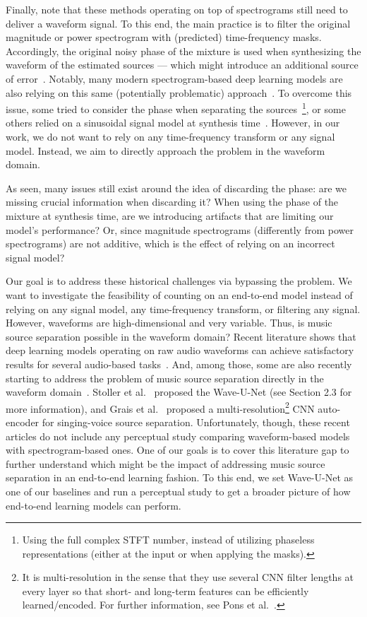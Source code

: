 \documentclass[a4paper]{article}
\begin{document}
Finally, note that these methods operating on top of spectrograms still need to deliver a waveform signal. To this end, the main practice is to filter the original magnitude or power spectrogram with (predicted) time-frequency masks. Accordingly, the original noisy phase of the mixture is used when synthesizing the waveform of the estimated sources --- which might introduce an additional source of error~\cite{virtanen2006unsupervised}. Notably, many modern spectrogram-based deep learning models are also relying on this same (potentially problematic) approach~\cite{chandna2017monoaural,huang2014singing}. 
To overcome this issue, some tried to consider the phase when separating the sources~\cite{kameoka2009complex, dubey2017does, le2019phasebook}\footnote{Using the full complex STFT number, instead of utilizing phaseless representations (either at the input or when applying the masks).}, or some others relied on a sinusoidal signal model at synthesis time~\cite{virtanen2000separation}.
However, in our work, we do not want to rely on any time-frequency transform or any signal model. Instead, we aim to directly approach the problem in the waveform domain.

As seen, many issues still exist around the idea of discarding the phase: are we missing crucial information when discarding it? When using the phase of the mixture at synthesis time, are we introducing artifacts that are limiting our model's performance? Or, since magnitude spectrograms (differently from power spectrograms) are not additive, which is the effect of relying on an incorrect signal model?

Our goal is to address these historical challenges via bypassing the problem. We want to investigate the feasibility of counting on an end-to-end model instead of relying on any signal model, any time-frequency transform, or filtering any signal. However, waveforms are high-dimensional and very variable. Thus, is music source separation possible in the waveform domain?
Recent literature shows that deep learning models operating on raw audio waveforms can achieve satisfactory results for several audio-based tasks~\cite{oord2017parallel,pons2018randomly,pons2017end}. 
And, among those, some are also recently starting to address the problem of music source separation directly in the waveform domain~\cite{stoller2018wave,grais2018raw}. 
Stoller et al.~\cite{stoller2018wave} proposed the Wave-U-Net (see Section 2.3 for more information), and Grais et al.~\cite{grais2018raw} proposed a multi-resolution\footnote{It is multi-resolution in the sense that they use several CNN filter lengths at every layer so that short- and long-term features can be efficiently learned/encoded. For further information, see Pons et al.~\cite{pons2018randomly}.} CNN auto-encoder for singing-voice source separation.
Unfortunately, though, these recent articles do not include any perceptual study comparing waveform-based models with spectrogram-based ones. One of our goals is to cover this literature gap to further understand which might be the impact of addressing music source separation in an end-to-end learning fashion. 
To this end, we set Wave-U-Net as one of our baselines and run a perceptual study to get a broader picture of how end-to-end learning models can perform.
\end{document}
